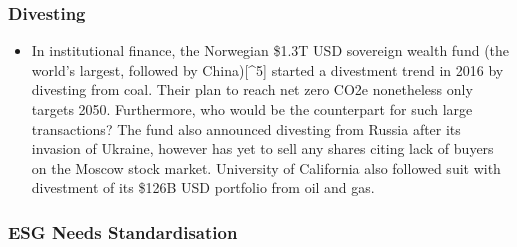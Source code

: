 \documentclass[
  letterpaper,
  DIV=11,
  numbers=noendperiod]{scrartcl}
\providecommand{\tightlist}{%
  \setlength{\itemsep}{0pt}\setlength{\parskip}{0pt}}\usepackage{longtable,booktabs,array}
\begin{document}
\subsubsection{Divesting}\label{divesting}

\begin{itemize}
\tightlist
\item
  In institutional finance, the Norwegian \$1.3T USD sovereign wealth
  fund (the world's largest, followed by China){[}\^{}5{]} started a
  divestment trend in 2016 by divesting from coal. Their plan to reach
  net zero CO2e nonetheless only targets 2050. Furthermore, who would be
  the counterpart for such large transactions? The fund also announced
  divesting from Russia after its invasion of Ukraine, however has yet
  to sell any shares citing lack of buyers on the Moscow stock market.
  University of California also followed suit with divestment of its
  \$126B USD portfolio from oil and gas.
\end{itemize}

\subsubsection{ESG Needs
Standardisation}\label{esg-needs-standardisation}
\end{document}
